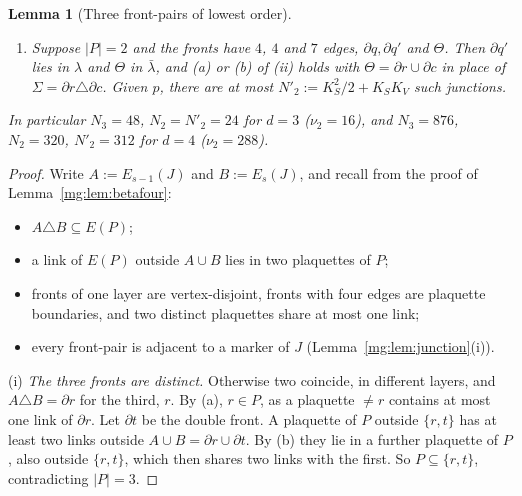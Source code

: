 \documentclass[11pt,a4paper]{article}
\newtheorem{lemma}[theorem]{Lemma}
\theoremstyle{definition}
\theoremstyle{remark}
\begin{document}
\begin{lemma}[Three front-pairs of lowest order]
\begin{enumerate}[label=(\roman*)]
\begin{itemize}
of the two remaining faces.
\end{itemize}
Given $p$, there are at most $N_2:=K_S^2/2+K_SK_V+8(d-3)$ such junctions.
\item Suppose $|P|=2$ and the fronts have $4$, $4$ and $7$ edges, $\partial q,\partial q'$ and $\Theta$. Then $\partial q'$ lies in $\lambda$ and $\Theta$ in $\bar\lambda$, and (a) or (b) of
(ii) holds with $\Theta=\partial r\cup\partial c$ in place of $\Sigma=\partial r\triangle\partial c$. Given $p$, there are at most $N'_2:=K_S^2/2+K_SK_V$ such junctions.
\end{enumerate}
In particular $N_3=48$, $N_2=N'_2=24$ for $d=3$ ($\nu_2=16$), and $N_3=876$, $N_2=320$, $N'_2=312$ for $d=4$ ($\nu_2=288$).
\end{lemma}

\begin{proof}
Write $A:=E_{s-1}(J)$ and $B:=E_s(J)$, and recall from the proof of Lemma~\ref{mg:lem:betafour}:
\begin{itemize}
\item[(a)] $A\triangle B\subseteq E(P)$;
\item[(b)] a link of $E(P)$ outside $A\cup B$ lies in two plaquettes of $P$;
\item fronts of one layer are vertex-disjoint, fronts with four edges are plaquette boundaries, and two distinct plaquettes share at most one link;
\item every front-pair is adjacent to a marker of $J$ (Lemma~\ref{mg:lem:junction}(i)).
\end{itemize}

(i) \emph{The three fronts are distinct.} Otherwise two coincide, in different layers, and $A\triangle B=\partial r$ for the third, $r$. By (a), $r\in P$, as a plaquette $\ne r$ contains at most
one link of $\partial r$. Let $\partial t$ be the double front. A plaquette of $P$ outside $\{r,t\}$ has at least two links outside $A\cup B=\partial r\cup\partial t$. By (b) they lie in a
further plaquette of $P$, also outside $\{r,t\}$, which then shares two links with the first. So $P\subseteq\{r,t\}$, contradicting $|P|=3$.


\end{proof}
\end{document}
